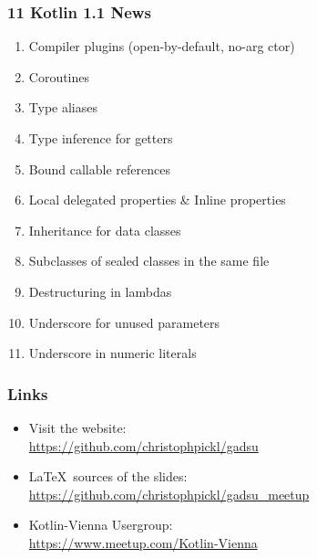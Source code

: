 \begin{frame}\frametitle{11 Kotlin 1.1 News}
\begin{enumerate}[<+->]
	\item {Compiler plugins (open-by-default, no-arg ctor)}
	\item {Coroutines}
	\item Type aliases
	\item Type inference for getters
	\item Bound callable references
	\item Local delegated properties \& Inline properties
	\item Inheritance for data classes
	\item Subclasses of sealed classes in the same file
	\item Destructuring in lambdas
	\item Underscore for unused parameters
	\item Underscore in numeric literals
\end{enumerate}
\end{frame}



\begin{frame}\frametitle{Links}

\begin{itemize}
	\item Visit the website: \\ \href{https://github.com/christophpickl/gadsu}{https://github.com/christophpickl/gadsu}
	\item \LaTeX~sources of the slides: \\ \href{https://github.com/christophpickl/gadsu_meetup}{https://github.com/christophpickl/gadsu\_meetup}
	\item Kotlin-Vienna Usergroup: \\ \href{https://www.meetup.com/Kotlin-Vienna}{https://www.meetup.com/Kotlin-Vienna}
	
\end{itemize}

\end{frame}



